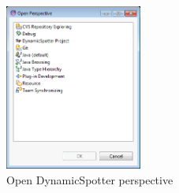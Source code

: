 \documentclass{report}
\newcommand{\DS}{DynamicSpotter }
\begin{document}
\begin{figure}[h]
\centering
\includegraphics[width=0.4\textwidth]{figures/demo/0001-openPerspective.png}
\caption{Open \DS perspective}
\label{fig:openPerspective}
\end{figure}
\end{document}
